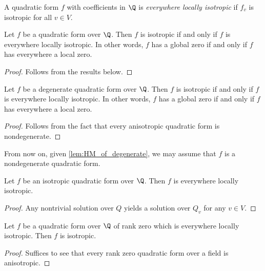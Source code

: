 \begin{definition}\label{def:everywhere_locally_isotropic}
\leanok
A quadratic form $f$ with coefficients in $\Q$ is \emph{everywhere locally isotropic} if $f_v$ is isotropic for all $v \in V$.
\end{definition}

\begin{theorem}\label{thm:Hasse-Minkowski}
\leanok
Let $f$ be a quadratic form over $\Q$. Then $f$ is isotropic if and only if $f$ is everywhere locally isotropic. In other words, $f$ has a global zero if and only if $f$ has everywhere a local zero. 
\end{theorem}
\begin{proof}
Follows from the results below.
\end{proof}

\begin{theorem}\label{lem:HM_of_degenerate}
	\leanok
	Let $f$ be a degenerate quadratic form over $\Q$. Then $f$ is isotropic if and only if $f$ is everywhere locally isotropic. In other words, $f$ has a global zero if and only if $f$ has everywhere a local zero. 
\end{theorem}
\begin{proof}
Follows from the fact that every anisotropic quadratic form is nondegenerate.	
\end{proof}

From now on, given \ref{lem:HM_of_degenerate}, we may assume that $f$ is a nondegenerate quadratic form.

\begin{lemma}\label{lem:ev_loc_isotr_of_isotr}
\leanok
Let $f$ be an isotropic quadratic form over $\Q$. Then $f$ is everywhere locally isotropic.
\end{lemma}
\begin{proof}
Any nontrivial solution over $Q$ yields a solution over $Q_v$ for any $v \in V$.	
\end{proof}

\begin{lemma}\label{lem:isotr_of_rk_zero}
	\leanok
	Let $f$ be a quadratic form over $\Q$ of rank zero which is everywhere locally isotropic. Then $f$ is isotropic.
\end{lemma}
\begin{proof}
Suffices to see that every rank zero quadratic form over a field is anisotropic.
\end{proof}

